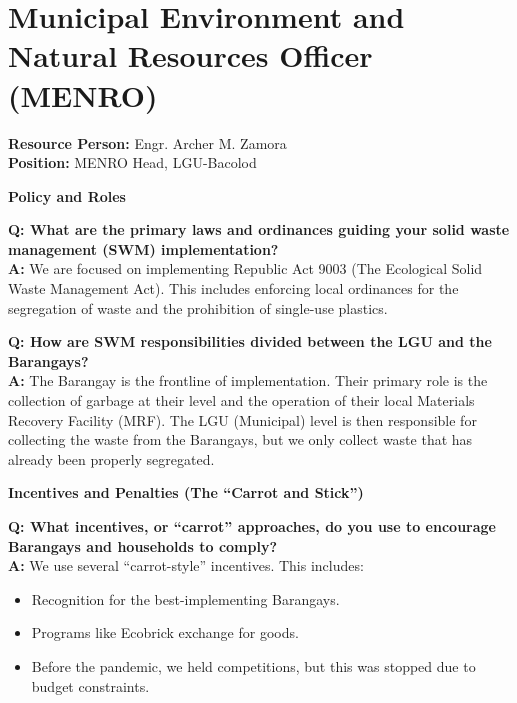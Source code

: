 \section{Municipal Environment and Natural Resources Officer (MENRO)}
\label{appendix:menro_interview}

\noindent
\textbf{Resource Person:} Engr. Archer M. Zamora \\
\textbf{Position:} MENRO Head, LGU-Bacolod \\

\vspace{0.5cm}

\noindent \textbf{\large Policy and Roles}
\vspace{0.2cm}

\noindent \textbf{Q: What are the primary laws and ordinances guiding your solid waste management (SWM) implementation?} \\
\textbf{A:} We are focused on implementing Republic Act 9003 (The Ecological Solid Waste Management Act). This includes enforcing local ordinances for the segregation of waste and the prohibition of single-use plastics.

\vspace{0.3cm}

\noindent \textbf{Q: How are SWM responsibilities divided between the LGU and the Barangays?} \\
\textbf{A:} The Barangay is the frontline of implementation. Their primary role is the collection of garbage at their level and the operation of their local Materials Recovery Facility (MRF). The LGU (Municipal) level is then responsible for collecting the waste from the Barangays, but we only collect waste that has already been properly segregated.

\vspace{0.5cm}

\noindent \textbf{\large Incentives and Penalties (The ``Carrot and Stick'')}
\vspace{0.2cm}

\noindent \textbf{Q: What incentives, or ``carrot'' approaches, do you use to encourage Barangays and households to comply?} \\
\textbf{A:} We use several ``carrot-style'' incentives. This includes:
\begin{itemize}
    \item Recognition for the best-implementing Barangays.
    \item Programs like Ecobrick exchange for goods.
    \item Before the pandemic, we held competitions, but this was stopped due to budget constraints.
\end{itemize}

